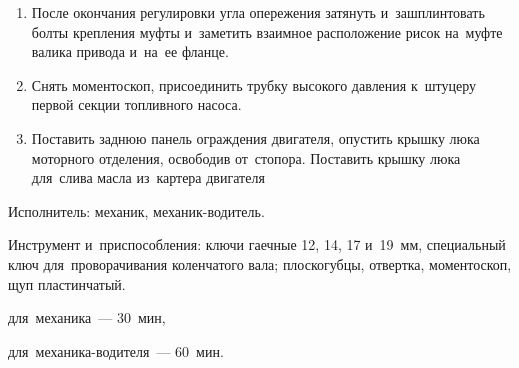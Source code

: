 \begin{enumerate}
    Несовпадение рисок должно быть не~больше одного градуса (одно деление). 

    Смещение полумуфты относительно ее фланца на~одно деление соответствует четырем делениям на~маховике или~крышке шестерен распределения. 
    \item После окончания регулировки угла опережения затянуть и~зашплинтовать болты крепления муфты и~заметить взаимное расположение рисок на~муфте валика привода и~на~ее фланце. 
    \item Снять моментоскоп, присоединить трубку высокого давления к~штуцеру первой секции топливного насоса. 
    \item Поставить заднюю панель ограждения двигателя, опустить крышку люка моторного отделения, освободив от~стопора. Поставить крышку люка для~слива масла из~картера двигателя
\end{enumerate}



\noindent
Исполнитель: механик, механик-водитель. 

\noindent
Инструмент и~приспособления: ключи гаечные 12, 14, 17 и~19~мм, специальный ключ для~проворачивания коленчатого вала; плоскогубцы, отвертка, моментоскоп, щуп пластинчатый. 

\begin{standarttime}
    \item для~механика~--- 30~мин,
    \item для~механика-водителя~--- 60~мин. 
\end{standarttime}

